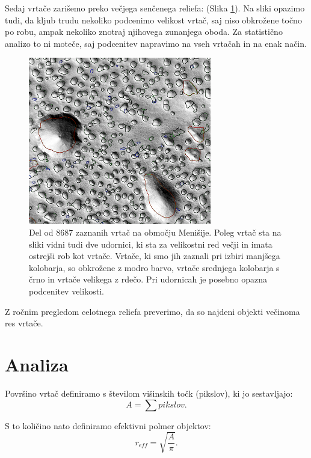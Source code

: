 \documentclass[a4paper, twoside, 12pt]{book}
\begin{document}
Sedaj vrtače zarišemo preko večjega senčenega reliefa: (Slika \ref{fig:menisija-vrtace}). Na sliki opazimo tudi, da kljub trudu nekoliko podcenimo velikost vrtač, saj niso obkrožene točno po robu, ampak nekoliko znotraj njihovega zunanjega oboda. Za statistično analizo to ni moteče, saj podcenitev napravimo na vseh vrtačah in na enak način.
  \begin{figure}[h]
    \begin{center}
      \includegraphics[width=8cm]{slike/menisija-vrtace}
    \end{center}
    \caption{Del od 8687 zaznanih vrtač na območju Menišije. Poleg vrtač sta na sliki vidni tudi dve udornici, ki sta za velikostni red večji in imata ostrejši rob kot vrtače. Vrtače, ki smo jih zaznali pri izbiri manjšega kolobarja, so obkrožene z modro barvo, vrtače srednjega kolobarja s črno in vrtače velikega z rdečo. Pri udornicah je posebno opazna podcenitev velikosti.}
    \label{fig:menisija-vrtace}
  \end{figure}

Z ročnim pregledom celotnega reliefa preverimo, da so najdeni objekti večinoma res vrtače.

  \section{Analiza}

  Površino vrtač definiramo s številom višinskih točk (pikslov), ki jo sestavljajo:
    \begin{equation}
      A = \sum pikslov.
    \end{equation}

S to količino nato definiramo efektivni polmer objektov:
    \begin{equation} 
      r_{eff} = \sqrt{\frac{A}{\pi}}. 
    \end{equation}
\end{document}
